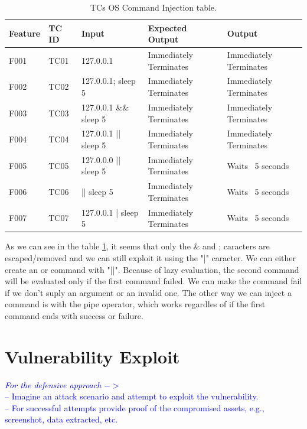 \documentclass{article}
\begin{document}
\begin{table} [htpb]
    \centering
    \begin{tabular}{l|l|l|l|l}
        Feature & TC ID & Input                  & Expected Output        & Output                 \\ \hline
        F001    & TC01  & 127.0.0.1              & Immediately Terminates & Immediately Terminates \\
        F002    & TC02  & 127.0.0.1; sleep 5     & Immediately Terminates & Immediately Terminates \\
        F003    & TC03  & 127.0.0.1 \&\& sleep 5 & Immediately Terminates & Immediately Terminates \\
        F004    & TC04  & 127.0.0.1 || sleep 5   & Immediately Terminates & Immediately Terminates \\
        F005    & TC05  & 127.0.0.0 || sleep 5   & Immediately Terminates & Waits ~5 seconds       \\
        F006    & TC06  & || sleep 5             & Immediately Terminates & Waits ~5 seconds       \\
        F007    & TC07  & 127.0.0.1 | sleep 5    & Immediately Terminates & Waits ~5 seconds       \\
    \end{tabular}
    \caption{\label{tab:TC-command-injection}TCs OS Command Injection table.}
\end{table}

As we can see in the table \ref{tab:TC-command-injection}, it seems that only the \& and ; caracters are escaped/removed and we can still exploit it using the "|" caracter.
We can either create an or command with "||". Because of lazy evaluation, the second command will be evaluated only if the first command failed.
We can make the command fail if we don't suply an argument or an invalid one.
The other way we can inject a command is with the pipe operator, which works regardles of if the first command ends with success or failure.


\section{Vulnerability Exploit}
\label{}

\textcolor{blue}{\textit{For the defensive approach} $->$\\
    -- Imagine an attack scenario and attempt to exploit the vulnerability.\\
    -- For successful attempts provide proof of the compromised assets, e.g., screenshot, data extracted, etc.}
\end{document}
